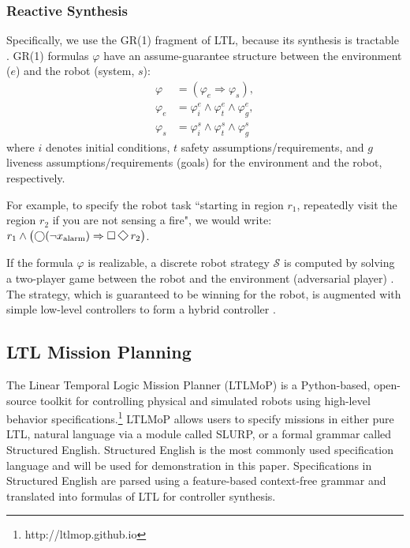 \subsubsection*{Reactive Synthesis}\label{GR(1)}
Specifically, we use the GR(1) fragment of LTL, because its synthesis is tractable \cite{piterman_06}. GR(1) formulas $\varphi$ have an assume-guarantee structure between the environment ($e$) and the robot (system, $s$):
\begin{align*}
	\varphi &= (\varphi_e \Rightarrow \varphi_s),\\
	\varphi_e &= \varphi_i^e \wedge \varphi_t^e \wedge \varphi_g^e,\\
	\varphi_s &= \varphi_i^s \wedge \varphi_t^s \wedge \varphi_g^s
\end{align*}
where $i$ denotes initial conditions, $t$ safety assumptions/requirements, and $g$ liveness assumptions/requirements (goals) for the environment and the robot, respectively.

For example, to specify the robot task ``starting in region $r_1$, repeatedly visit the region $r_2$ if you are not sensing a fire", we would write: $r_1 \wedge \left(\X(\neg x_{\text{alarm}}) \Rightarrow \G\F r_2 \right)$.

If the formula $\varphi$ is realizable, a discrete robot strategy $\mathcal{S}$ is computed by solving a two-player game between the robot and the environment (adversarial player) \cite{piterman_06}. The strategy, which is guaranteed to be winning for the robot, is augmented with simple low-level controllers to form a hybrid controller \cite{KGFP_TRO09}.

\subsection{LTL Mission Planning}\label{preliminariesB}

The Linear Temporal Logic Mission Planner (LTLMoP) \cite{Finucane2010} is a Python-based, open-source toolkit for controlling physical and simulated robots using high-level behavior specifications.\footnote{http://ltlmop.github.io} 
LTLMoP allows users to specify missions in either pure LTL, natural language via a module called SLURP, or a formal grammar called Structured English. Structured English is the most commonly used specification language and will be used for demonstration in this paper. Specifications in Structured English are parsed using a feature-based context-free grammar and translated into formulas of LTL for controller synthesis. 
